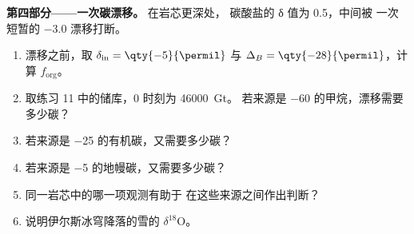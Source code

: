 \begin{problem}
\medskip\noindent\textbf{第四部分——一次碳漂移。} 在岩芯更深处，
碳酸盐的 δ 值为 \qty{+0.5}{\permil}，中间被
一次短暂的 \qty{-3.0}{\permil} 漂移打断。
\begin{enumerate}[resume]
\item 漂移之前，取 $\delta_{\mathrm{in}} = \qty{-5}{\permil}$ 与
$\Delta_B = \qty{-28}{\permil}$，计算 $f_{\mathrm{org}}$。
\item 取练习 11 中的储库，0 时刻为 \qty{46000}{Gt}。
若来源是 \qty{-60}{\permil} 的甲烷，漂移需要多少碳？
\item 若来源是 \qty{-25}{\permil} 的有机碳，又需要多少碳？
\item 若来源是 \qty{-5}{\permil} 的地幔碳，又需要多少碳？
\item 同一岩芯中的哪一项观测有助于
在这些来源之间作出判断？
\item 说明伊尔斯冰穹降落的雪的 $\delta^{18}\mathrm O$。
\end{enumerate}
\end{problem}
